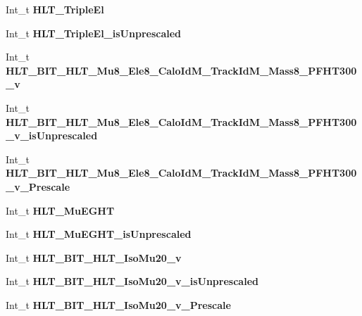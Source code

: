 \begin{DoxyCompactItemize}
Int\+\_\+t {\bfseries H\+L\+T\+\_\+\+Triple\+El}
\item 
\hypertarget{classMiniTree_a826fd01aa1099ab04de9b07e6508a411}{}\label{classMiniTree_a826fd01aa1099ab04de9b07e6508a411} 
Int\+\_\+t {\bfseries H\+L\+T\+\_\+\+Triple\+El\+\_\+is\+Unprescaled}
\item 
\hypertarget{classMiniTree_a60ae5135f8c6c8927ec4d825d7317161}{}\label{classMiniTree_a60ae5135f8c6c8927ec4d825d7317161} 
Int\+\_\+t {\bfseries H\+L\+T\+\_\+\+B\+I\+T\+\_\+\+H\+L\+T\+\_\+\+Mu8\+\_\+\+Ele8\+\_\+\+Calo\+Id\+M\+\_\+\+Track\+Id\+M\+\_\+\+Mass8\+\_\+\+P\+F\+H\+T300\+\_\+v}
\item 
\hypertarget{classMiniTree_a7d0934a59e18fc5ee5f63acac8b81529}{}\label{classMiniTree_a7d0934a59e18fc5ee5f63acac8b81529} 
Int\+\_\+t {\bfseries H\+L\+T\+\_\+\+B\+I\+T\+\_\+\+H\+L\+T\+\_\+\+Mu8\+\_\+\+Ele8\+\_\+\+Calo\+Id\+M\+\_\+\+Track\+Id\+M\+\_\+\+Mass8\+\_\+\+P\+F\+H\+T300\+\_\+v\+\_\+is\+Unprescaled}
\item 
\hypertarget{classMiniTree_a2f678173e66ba375a0c6447af7f5084c}{}\label{classMiniTree_a2f678173e66ba375a0c6447af7f5084c} 
Int\+\_\+t {\bfseries H\+L\+T\+\_\+\+B\+I\+T\+\_\+\+H\+L\+T\+\_\+\+Mu8\+\_\+\+Ele8\+\_\+\+Calo\+Id\+M\+\_\+\+Track\+Id\+M\+\_\+\+Mass8\+\_\+\+P\+F\+H\+T300\+\_\+v\+\_\+\+Prescale}
\item 
\hypertarget{classMiniTree_a1109458ec5574f08c8837bee9e9222d8}{}\label{classMiniTree_a1109458ec5574f08c8837bee9e9222d8} 
Int\+\_\+t {\bfseries H\+L\+T\+\_\+\+Mu\+E\+G\+HT}
\item 
\hypertarget{classMiniTree_ab5944c3ce3b3a45e4497fd7d91ab0960}{}\label{classMiniTree_ab5944c3ce3b3a45e4497fd7d91ab0960} 
Int\+\_\+t {\bfseries H\+L\+T\+\_\+\+Mu\+E\+G\+H\+T\+\_\+is\+Unprescaled}
\item 
\hypertarget{classMiniTree_a513c6030c1f7fa8de38bcfad3e62c405}{}\label{classMiniTree_a513c6030c1f7fa8de38bcfad3e62c405} 
Int\+\_\+t {\bfseries H\+L\+T\+\_\+\+B\+I\+T\+\_\+\+H\+L\+T\+\_\+\+Iso\+Mu20\+\_\+v}
\item 
\hypertarget{classMiniTree_af4dad0f47a2216f1201f51d308c168ba}{}\label{classMiniTree_af4dad0f47a2216f1201f51d308c168ba} 
Int\+\_\+t {\bfseries H\+L\+T\+\_\+\+B\+I\+T\+\_\+\+H\+L\+T\+\_\+\+Iso\+Mu20\+\_\+v\+\_\+is\+Unprescaled}
\item 
\hypertarget{classMiniTree_a182589481e279a82c0c42cc3410ef0e8}{}\label{classMiniTree_a182589481e279a82c0c42cc3410ef0e8} 
Int\+\_\+t {\bfseries H\+L\+T\+\_\+\+B\+I\+T\+\_\+\+H\+L\+T\+\_\+\+Iso\+Mu20\+\_\+v\+\_\+\+Prescale}
\item 

\end{DoxyCompactItemize}
